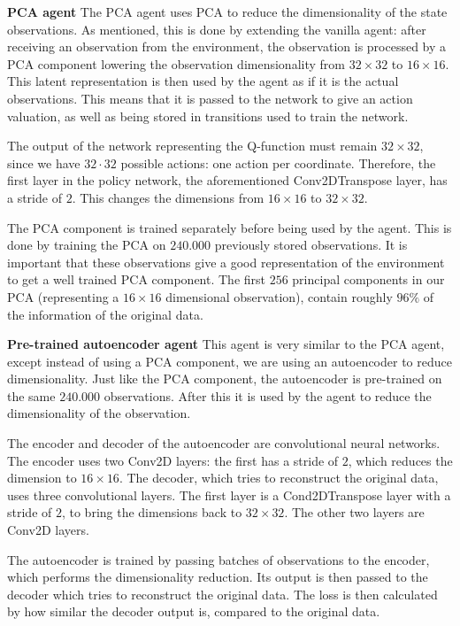 \noindent \textbf{PCA agent}\newline
\noindent The PCA agent uses PCA to reduce the dimensionality of the state observations. As mentioned, this is done by extending the vanilla agent: after receiving an observation from the environment, the observation is processed by a PCA component lowering the observation dimensionality from $32 \times 32$ to $16 \times 16$. This latent representation is then used by the agent as if it is the actual observations. This means that it is passed to the network to give an action valuation, as well as being stored in transitions used to train the network.

The output of the network representing the Q-function must remain $32 \times 32$, since we have $32 \cdot 32$ possible actions: one action per coordinate. Therefore, the first layer in the policy network, the aforementioned Conv2DTranspose layer, has a stride of $2$. This changes the dimensions from $16 \times 16$ to $32 \times 32$. 

The PCA component is trained separately before being used by the agent. This is done by training the PCA on $240.000$ previously stored observations. It is important that these observations give a good representation of the environment to get a well trained PCA component. The first $256$ principal components in our PCA (representing a $16 \times 16$ dimensional observation), contain roughly $96\%$ of the information of the original data.\newline

\noindent \textbf{Pre-trained autoencoder agent}\newline
\noindent This agent is very similar to the PCA agent, except instead of using a PCA component, we are using an autoencoder to reduce dimensionality. Just like the PCA component, the autoencoder is pre-trained on the same $240.000$ observations. After this it is used by the agent to reduce the dimensionality of the observation. 

The encoder and decoder of the autoencoder are convolutional neural networks. The encoder uses two Conv2D layers: the first has a stride of $2$, which reduces the dimension to $16 \times 16$. The decoder, which tries to reconstruct the original data, uses three convolutional layers. The first layer is a Cond2DTranspose layer with a stride of $2$, to bring the dimensions back to $32 \times 32$. The other two layers are Conv2D layers. 

The autoencoder is trained by passing batches of observations to the encoder, which performs the dimensionality reduction. Its output is then passed to the decoder which tries to reconstruct the original data. The loss is then calculated by how similar the decoder output is, compared to the original data.


